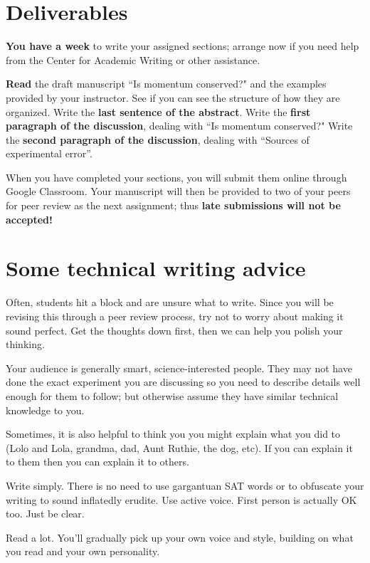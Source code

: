 \documentclass [hw,addpoints,noanswers]{exam}
\begin{document}
\clearpage
\section{Deliverables}
\textbf{You have a week} to write your assigned sections; arrange now if you need help from the Center for Academic Writing or other assistance.  
\begin{questions}
\question \textbf{Read} the draft manuscript ``Is momentum conserved?" and the examples provided by your instructor. See if you can see the structure of how they are organized. 
\question Write the \textbf{last sentence of the abstract}. 
\question Write the \textbf{first paragraph of the discussion}, dealing with ``Is momentum conserved?" 
\question Write the \textbf{second paragraph of the discussion}, dealing with ``Sources of experimental error''. 
\end{questions}
When you have completed your sections, you will submit them online through Google Classroom. Your manuscript will then be provided to two of your peers for peer review as the next assignment; thus \textbf{late submissions will not be accepted!}

\section{Some technical writing advice}
Often, students hit a block and are unsure what to write. Since you will be revising this through a peer review process, try not to worry about making it sound perfect. Get the thoughts down first, then we can help you polish your thinking.

Your audience is generally smart, science-interested people. They may not have done the exact experiment you are discussing so you need to describe details well enough for them to follow; but otherwise assume they have similar technical knowledge to you. 

Sometimes, it is also helpful to think you you might explain what you did to (Lolo and Lola, grandma, dad, Aunt Ruthie, the dog, etc). If you can explain it to them then you can explain it to others. 

Write simply. There is no need to use gargantuan SAT words or to obfuscate your writing to sound inflatedly erudite. Use active voice. First person is actually OK too. Just be clear. 

Read a lot. You'll gradually pick up your own voice and style, building on what you read and your own personality. 
\end{document}
